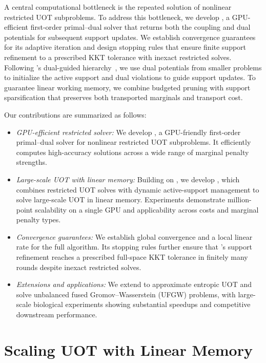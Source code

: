 A central computational bottleneck is the repeated solution of nonlinear restricted UOT subproblems.
To address this bottleneck, we develop \subsolver, a GPU-efficient first-order primal--dual solver that returns both the coupling and dual potentials for subsequent support updates.
We establish convergence guarantees for its adaptive iteration and design stopping rules that ensure finite support refinement to a prescribed KKT tolerance with inexact restricted solves.
Following \hello's dual-guided hierarchy~\citep{xia2026dual}, we use dual potentials from smaller problems to initialize the active support and dual violations to guide support updates.
To guarantee linear working memory, we combine budgeted pruning with support sparsification that preserves both transported marginals and transport cost.

Our contributions are summarized as follows:
\begin{itemize}
    \item \textit{GPU-efficient restricted solver:} We develop \subsolver, a GPU-friendly first-order primal--dual solver for nonlinear restricted UOT subproblems.
It efficiently computes high-accuracy solutions across a wide range of marginal penalty strengths.
    \item \textit{Large-scale UOT with linear memory:} Building on \subsolver, we develop \ours, which combines restricted UOT solves with dynamic active-support management to solve large-scale UOT in linear memory.
Experiments demonstrate million-point scalability on a single GPU and applicability across costs and marginal penalty types.
   \item \textit{Convergence guarantees:} We establish global convergence and a local linear rate for the full \subsolver algorithm.
    Its stopping rules further ensure that \ours's support refinement reaches a prescribed full-space KKT tolerance in finitely many rounds despite inexact restricted solves.
    \item \textit{Extensions and applications:} We extend \ours to approximate entropic UOT and solve unbalanced fused Gromov--Wasserstein (UFGW) problems, with large-scale biological experiments showing substantial speedups and competitive downstream performance.
\end{itemize}

\section{Scaling UOT with Linear Memory}
\label{sec:method}

